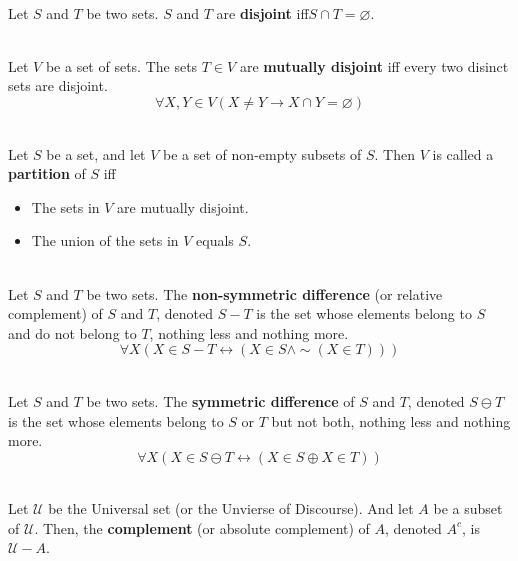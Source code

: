 \documentclass[12pt]{article}
\begin{document}
\begin{definition}[Disjoint(6.4.5)]
\hfill\\
\normalfont Let $S$ and $T$ be two sets. $S$ and $T$ are \textbf{disjoint} iff$S\cap T=\varnothing$.
\end{definition}
\begin{definition}
\hfill\\
\normalfont Let $V$ be a set of sets. The sets $T\in V$ are \textbf{mutually disjoint} iff every two disinct sets are disjoint.
\[
\forall X, Y\in V(X\neq Y \rightarrow X\cap Y = \varnothing)
\]
\end{definition}
\begin{definition}[Partition(6.4.7)]
\hfill\\
\normalfont Let $S$ be a set, and let $V$ be a set of non-empty subsets of $S$. Then $V$ is called a \textbf{partition} of $S$ iff
\begin{itemize}
\item The sets in $V$ are mutually disjoint.
\item The union of the sets in $V$ equals $S$.
\end{itemize}
\end{definition}
\begin{definition}
\hfill\\
\normalfont Let $S$ and $T$ be two sets. The \textbf{non-symmetric difference} (or relative complement) of $S$ and $T$, denoted $S - T$ is the set whose elements belong to $S$ and do not belong to $T$, nothing less and nothing more.
\[
\forall X(X\in S - T\leftrightarrow(X\in S\land \sim(X\in T)))
\]
\end{definition}
\begin{definition}
\hfill\\
\normalfont Let $S$ and $T$ be two sets. The \textbf{symmetric difference} of $S$ and $T$, denoted $S\ominus T$ is the set whose elements belong to $S$ or $T$ but not both, nothing less and nothing more.
\[
\forall X(X\in S\ominus T\leftrightarrow(X\in S \oplus X\in T))
\]
\end{definition}
\begin{definition}
\hfill\\
\normalfont Let $\mathcal{U}$ be the Universal set (or the Unvierse of Discourse). And let $A$ be a subset of $\mathcal{U}$. Then, the \textbf{complement} (or absolute complement) of $A$, denoted $A^{c}$, is $\mathcal{U}-A$.
\end{definition}
\end{document}
